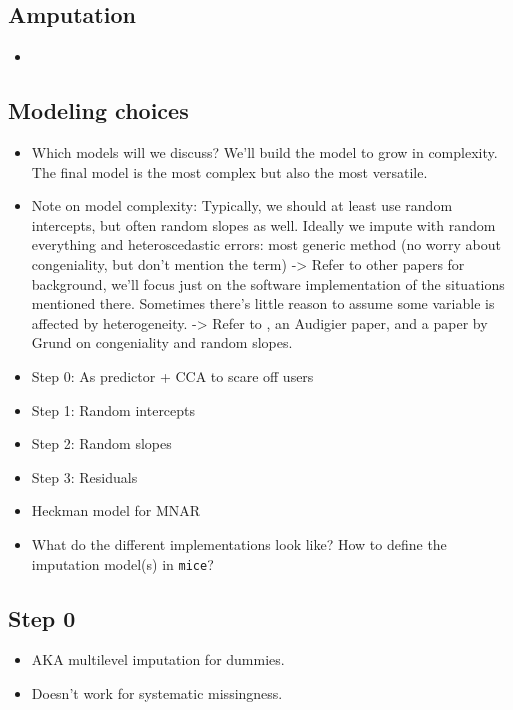 \documentclass[
]{jss}
\providecommand{\tightlist}{%
  \setlength{\itemsep}{0pt}\setlength{\parskip}{0pt}}
\begin{document}
\hypertarget{amputation}{%
\subsection{Amputation}\label{amputation}}

\begin{itemize}
\tightlist
\item
\end{itemize}

\hypertarget{modeling-choices}{%
\subsection{Modeling choices}\label{modeling-choices}}

\begin{itemize}
\item
  Which models will we discuss? We'll build the model to grow in
  complexity. The final model is the most complex but also the most
  versatile.
\item
  Note on model complexity: Typically, we should at least use random
  intercepts, but often random slopes as well. Ideally we impute with
  random everything and heteroscedastic errors: most generic method (no
  worry about congeniality, but don't mention the term) -\textgreater{}
  Refer to other papers for background, we'll focus just on the software
  implementation of the situations mentioned there. Sometimes there's
  little reason to assume some variable is affected by heterogeneity.
  -\textgreater{} Refer to \citet{meng94}, an Audigier paper, and a
  paper by Grund on congeniality and random slopes.
\item
  Step 0: As predictor + CCA to scare off users
\item
  Step 1: Random intercepts
\item
  Step 2: Random slopes
\item
  Step 3: Residuals
\item
  Heckman model for MNAR
\item
  What do the different implementations look like? How to define the
  imputation model(s) in \texttt{mice}?
\end{itemize}

\hypertarget{step-0}{%
\subsection{Step 0}\label{step-0}}

\begin{itemize}
\item
  AKA multilevel imputation for dummies.
\item
  Doesn't work for systematic missingness.
\end{itemize}
\end{document}
